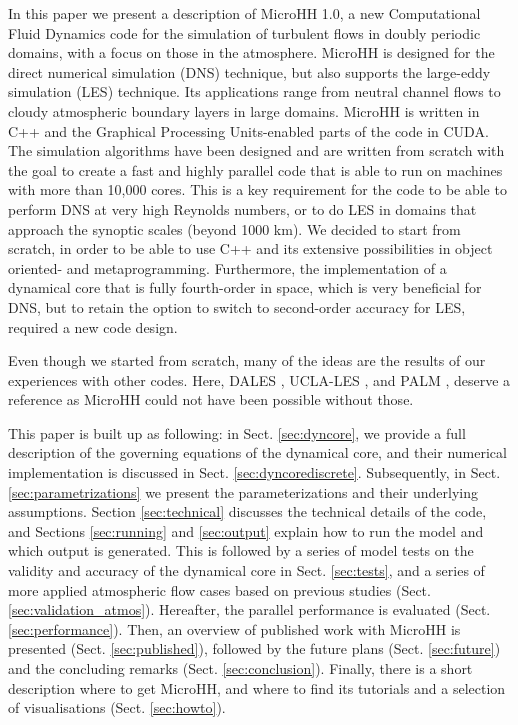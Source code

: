 \documentclass[gmd,manuscript]{copernicus}
\begin{document}
\introduction  %
In this paper we present a description of MicroHH 1.0, a new Computational Fluid Dynamics code for the simulation of turbulent flows in doubly periodic domains, with a focus on those in the atmosphere. MicroHH is designed for the direct numerical simulation (DNS) technique, but also supports the large-eddy simulation (LES) technique. Its applications range from neutral channel flows to cloudy atmospheric boundary layers in large domains. MicroHH is written in C++ and the Graphical Processing Units-enabled parts of the code in CUDA. The simulation algorithms have been designed and are written from scratch with the goal to create a fast and highly parallel code that is able to run on machines with more than 10,000 cores. This is a key requirement for the code to be able to perform DNS at very high Reynolds numbers, or to do LES in domains that approach the synoptic scales (beyond 1000 km). We decided to start from scratch, in order to be able to use C++ and its extensive possibilities in object oriented- and metaprogramming. Furthermore, the implementation of a dynamical core that is fully fourth-order in space, which is very beneficial for DNS, but to retain the option to switch to second-order accuracy for LES, required a new code design.

Even though we started from scratch, many of the ideas are the results of our experiences with other codes. Here, DALES \citep{Heus2010}, UCLA-LES \citep{Stevens2005}, and PALM \citep{Maronga2015}, deserve a reference as MicroHH could not have been possible without those.

This paper is built up as following: in Sect. \ref{sec:dyncore}, we provide a full description of the governing equations of the dynamical core, and their numerical implementation is discussed in Sect. \ref{sec:dyncorediscrete}. Subsequently, in Sect. \ref{sec:parametrizations} we present the parameterizations and their underlying assumptions. Section \ref{sec:technical} discusses the technical details of the code, and Sections \ref{sec:running} and \ref{sec:output} explain how to run the model and which output is generated. This is followed by a series of model tests on the validity and accuracy of the dynamical core in Sect. \ref{sec:tests}, and a series of more applied atmospheric flow cases based on previous studies (Sect. \ref{sec:validation_atmos}). Hereafter, the parallel performance is evaluated (Sect. \ref{sec:performance}). Then, an overview of published work with MicroHH is presented (Sect. \ref{sec:published}), followed by the future plans (Sect. \ref{sec:future}) and the concluding remarks (Sect. \ref{sec:conclusion}). Finally, there is a short description where to get MicroHH, and where to find its tutorials and a selection of visualisations (Sect. \ref{sec:howto}).
\end{document}
